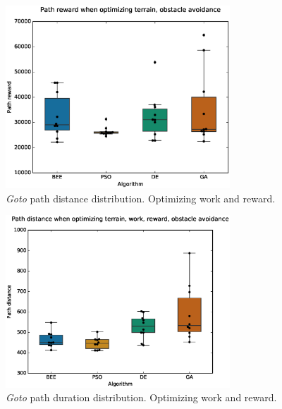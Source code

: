 \documentclass{tamuccthesis}
\begin{document}
\begin{figure}[H]
    \captionsetup{justification=centering}
    \centering
    \includegraphics[width=0.75\textwidth,trim={0cm 0.75cm 0cm 0.75cm},clip]{EXP3_histo_reward_a.eps}
    \caption{\textit{Goto} path distance distribution. Optimizing work and reward. }
    \label{fig:algcompare_a_reward}
\end{figure}

\begin{figure}[H]
    \captionsetup{justification=centering}
    \centering
    \includegraphics[width=0.75\textwidth,trim={0cm 0.75cm 0cm 0.75cm},clip]{EXP3_histo_distance_b.eps}
    \caption{\textit{Goto} path duration distribution. Optimizing work and reward. }
    \label{fig:algcompare_b_distance}
\end{figure}
\end{document}
